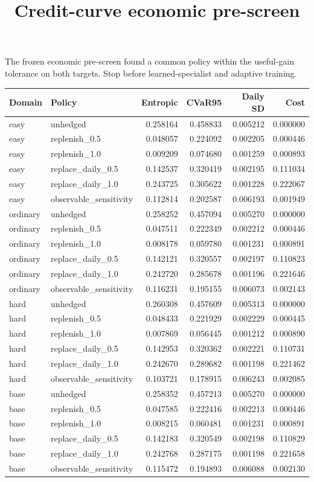 \documentclass{article}
\begin{document}
\title{Credit-curve economic pre-screen}\maketitle
The frozen economic pre-screen found a common policy within the useful-gain tolerance on both targets. Stop before learned-specialist and adaptive training.
\scriptsize
\begin{longtable}{llrrrr}
Domain & Policy & Entropic & CVaR95 & Daily SD & Cost \\
\hline
easy & unhedged & 0.258164 & 0.458833 & 0.005212 & 0.000000 \\
easy & replenish\_0.5 & 0.048057 & 0.224092 & 0.002205 & 0.000446 \\
easy & replenish\_1.0 & 0.009209 & 0.074680 & 0.001259 & 0.000893 \\
easy & replace\_daily\_0.5 & 0.142537 & 0.320419 & 0.002195 & 0.111034 \\
easy & replace\_daily\_1.0 & 0.243725 & 0.305622 & 0.001228 & 0.222067 \\
easy & observable\_sensitivity & 0.112814 & 0.202587 & 0.006193 & 0.001949 \\
ordinary & unhedged & 0.258252 & 0.457094 & 0.005270 & 0.000000 \\
ordinary & replenish\_0.5 & 0.047511 & 0.222349 & 0.002212 & 0.000446 \\
ordinary & replenish\_1.0 & 0.008178 & 0.059780 & 0.001231 & 0.000891 \\
ordinary & replace\_daily\_0.5 & 0.142121 & 0.320557 & 0.002197 & 0.110823 \\
ordinary & replace\_daily\_1.0 & 0.242720 & 0.285678 & 0.001196 & 0.221646 \\
ordinary & observable\_sensitivity & 0.116231 & 0.195155 & 0.006073 & 0.002143 \\
hard & unhedged & 0.260308 & 0.457609 & 0.005313 & 0.000000 \\
hard & replenish\_0.5 & 0.048433 & 0.221929 & 0.002229 & 0.000445 \\
hard & replenish\_1.0 & 0.007869 & 0.056445 & 0.001212 & 0.000890 \\
hard & replace\_daily\_0.5 & 0.142953 & 0.320362 & 0.002221 & 0.110731 \\
hard & replace\_daily\_1.0 & 0.242670 & 0.289682 & 0.001198 & 0.221462 \\
hard & observable\_sensitivity & 0.103721 & 0.178915 & 0.006243 & 0.002085 \\
base & unhedged & 0.258352 & 0.457213 & 0.005270 & 0.000000 \\
base & replenish\_0.5 & 0.047585 & 0.222416 & 0.002213 & 0.000446 \\
base & replenish\_1.0 & 0.008215 & 0.060481 & 0.001231 & 0.000891 \\
base & replace\_daily\_0.5 & 0.142183 & 0.320549 & 0.002198 & 0.110829 \\
base & replace\_daily\_1.0 & 0.242768 & 0.287175 & 0.001198 & 0.221658 \\
base & observable\_sensitivity & 0.115472 & 0.194893 & 0.006088 & 0.002130 \\
\end{longtable}
\end{document}
